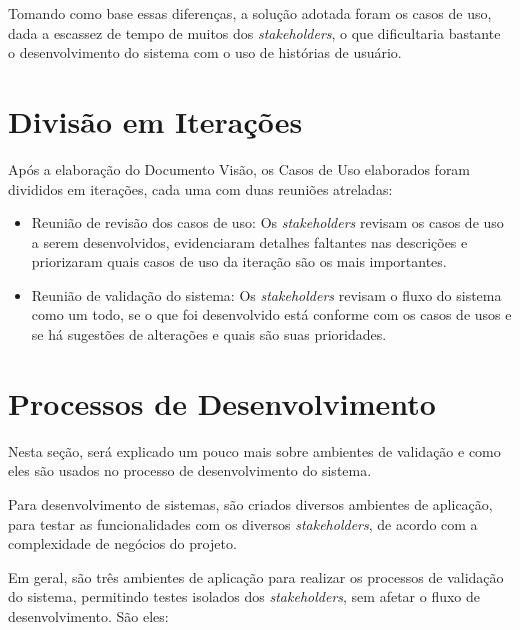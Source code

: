 Tomando como base essas diferenças, a solução adotada foram os casos de uso, dada a escassez de tempo de muitos dos \textit{stakeholders}, o que dificultaria bastante o desenvolvimento do sistema com o uso de histórias de usuário.

\section{Divisão em Iterações}
Após a elaboração do Documento Visão, os Casos de Uso elaborados foram divididos em iterações, cada uma com duas reuniões atreladas:

\begin{itemize}
    \item Reunião de revisão dos casos de uso: Os \textit{stakeholders} revisam os casos de uso a serem desenvolvidos, evidenciaram detalhes faltantes nas descrições e priorizaram quais casos de uso da iteração são os mais importantes.
    \item Reunião de validação do sistema: Os \textit{stakeholders} revisam o fluxo do sistema como um todo, se o que foi desenvolvido está conforme com os casos de usos e se há sugestões de alterações e quais são suas prioridades.
\end{itemize}

\section{Processos de Desenvolvimento}
Nesta seção, será explicado um pouco mais sobre ambientes de validação e como eles são usados no processo de desenvolvimento do sistema.

Para desenvolvimento de sistemas, são criados diversos ambientes de aplicação, para testar as funcionalidades com os diversos \textit{stakeholders}, de acordo com a complexidade de negócios do projeto.

Em geral, são três ambientes de aplicação para realizar os processos de validação do sistema, permitindo testes isolados dos \textit{stakeholders}, sem afetar o fluxo de desenvolvimento. São eles\cite{tracyragan2017}:


